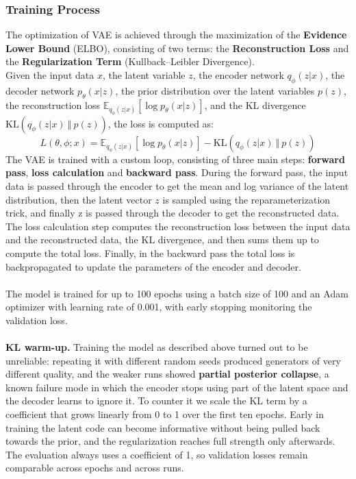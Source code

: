 \subsubsection{Training Process}
The optimization of VAE is achieved through the maximization of the \textbf{Evidence Lower Bound} (ELBO), consisting of two terms: the \textbf{Reconstruction Loss} and the \textbf{Regularization Term} (Kullback–Leibler Divergence).\\Given the input data $x$, the latent variable $z$, the encoder network $q_\phi(z\vert x)$, the decoder network $p_\theta(x\vert z)$, the prior distribution over the latent variables $p(z)$, the reconstruction loss $\mathbb{E}_{q_{\phi}(z\vert x)}[\log p_\theta(x\vert z)]$, and the KL divergence $\mathrm{KL}(q_\phi(z\vert x)\ \Vert\ p(z))$, the loss is computed as:
\\
\begin{equation}
L(\theta,\phi;x)=\mathbb{E}_{q_{\phi}(z\vert x)}[\log p_\theta(x\vert z)]-\mathrm{KL}(q_\phi(z\vert x)\ \Vert\ p(z))
\end{equation}
The VAE is trained with a custom loop, consisting of three main steps: \textbf{forward pass}, \textbf{loss calculation} and \textbf{backward pass}. During the forward pass, the input data is passed through the encoder to get the mean and log variance of the latent distribution, then the latent vector $z$ is sampled using the reparameterization trick, and finally z is passed through the decoder to get the reconstructed data. The loss calculation step computes the reconstruction loss between the input data and the reconstructed data, the KL divergence, and then sums them up to compute the total loss. Finally, in the backward pass the total loss is backpropagated to update the parameters of the encoder and decoder.
\\\\
The model is trained for up to 100 epochs using a batch size of 100 and an Adam optimizer \cite{kingma2015adam} with learning rate of 0.001, with early stopping monitoring the validation loss.
\\\\
\textbf{KL warm-up.} Training the model as described above turned out to be unreliable: repeating it with different random seeds produced generators of very different quality, and the weaker runs showed \textbf{partial posterior collapse}, a known failure mode in which the encoder stops using part of the latent space and the decoder learns to ignore it. To counter it we scale the KL term by a coefficient that grows linearly from 0 to 1 over the first ten epochs. Early in training the latent code can become informative without being pulled back towards the prior, and the regularization reaches full strength only afterwards. The evaluation always uses a coefficient of 1, so validation losses remain comparable across epochs and across runs.
